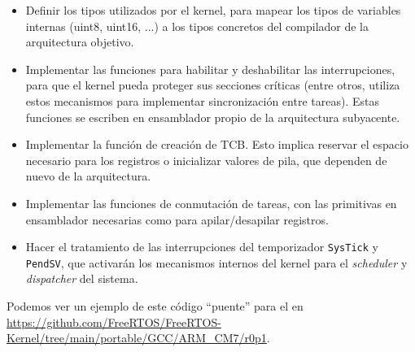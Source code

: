 \documentclass[../main.tex]{subfiles}
\begin{document}
            \begin{itemize}
                \item Definir los tipos utilizados por el kernel, para mapear los tipos de variables internas (uint8, uint16, ...) a los tipos concretos del compilador de la arquitectura objetivo.
                \item Implementar las funciones para habilitar y deshabilitar las interrupciones, para que el kernel pueda proteger sus secciones críticas (entre otros, utiliza estos mecanismos para implementar sincronización entre tareas). Estas funciones se escriben en ensamblador propio de la arquitectura subyacente.
                \item Implementar la función de creación de TCB. Esto implica reservar el espacio necesario para los registros o inicializar valores de pila, que dependen de nuevo de la arquitectura.
                \item Implementar las funciones de conmutación de tareas, con las primitivas en ensamblador necesarias como para apilar/desapilar registros.
                \item Hacer el tratamiento de las interrupciones del temporizador \texttt{SysTick} y \texttt{PendSV}, que activarán los mecanismos internos del kernel para el \emph{scheduler} y \emph{dispatcher} del sistema.
            \end{itemize}

            Podemos ver un ejemplo de este código ``puente'' para el \MCU en \url{https://github.com/FreeRTOS/FreeRTOS-Kernel/tree/main/portable/GCC/ARM_CM7/r0p1}.
        








   
\end{document}
